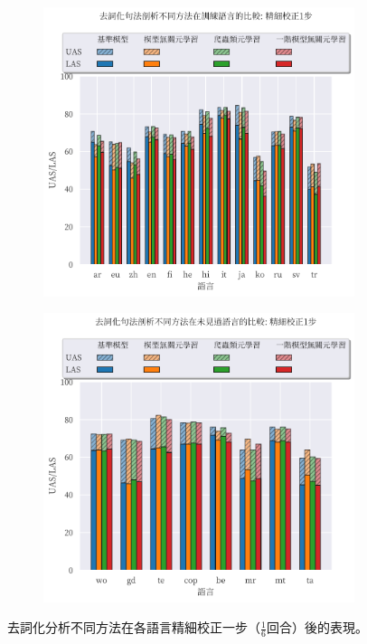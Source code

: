 \begin{figure}[!htbp]
    \centering
    \begin{subfigure}[t]{0.75\textwidth}
        \centering
        \includegraphics[width=\textwidth]{figs/chapter3/delex/bar_one_step_train_langs.pdf}
    \end{subfigure}
    \vspace{-12pt}
    \begin{subfigure}[t]{0.75\textwidth}
        \centering
        \includegraphics[width=\textwidth]{figs/chapter3/delex/bar_one_step_test_langs.pdf}
    \end{subfigure}
    \caption{去詞化分析不同方法在各語言精細校正一步（$\frac{1}{6}$回合）後的表現。}
    \label{fig:bar_one_step}
\end{figure}